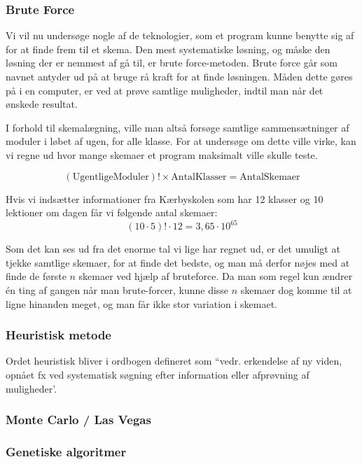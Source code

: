 \subsubsection{Brute Force}
Vi vil nu undersøge nogle af de teknologier, som et program kunne benytte sig af for at finde frem til et skema. Den mest systematiske løsning, og måske den løsning der er nemmest af gå til, er brute force-metoden. Brute force går som navnet antyder ud på at bruge rå kraft for at finde løsningen. Måden dette gøres på i en computer, er ved at prøve samtlige muligheder, indtil man når det ønskede resultat\cite{BruteForce}.

I forhold til skemalægning, ville man altså forsøge samtlige sammensætninger af moduler i løbet af ugen, for alle klasse. For at undersøge om dette ville virke, kan vi regne ud hvor mange skemaer et program maksimalt ville skulle teste.

$$ (\text{UgentligeModuler})! \times \text{AntalKlasser} = \text{AntalSkemaer}$$

Hvis vi indsætter informationer fra Kærbyskolen som har 12 klasser og 10 lektioner om dagen får vi følgende antal skemaer:
$$ (10\cdot 5)! \cdot 12 = 3,65\cdot 10^{65} $$

Som det kan ses ud fra det enorme tal vi lige har regnet ud, er det umuligt at tjekke samtlige skemaer, for at finde det bedste, og man må derfor nøjes med at finde de første $n$ skemaer ved hjælp af bruteforce. Da man som regel kun ændrer \'en ting af gangen når man brute-forcer, kunne disse $n$ skemaer dog komme til at ligne hinanden meget, og man får ikke stor variation i skemaet.

\subsubsection{Heuristisk metode}
Ordet heuristisk bliver i ordbogen defineret som ``vedr. erkendelse af ny viden, opnået fx ved systematisk søgning efter information eller afprøvning af muligheder'\cite{Ordnet}.

\subsubsection{Monte Carlo / Las Vegas}

\subsubsection{Genetiske algoritmer}
